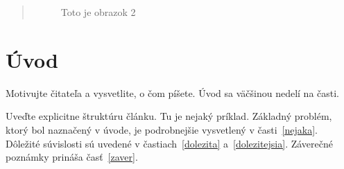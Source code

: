 \documentclass[12pt,twocolumn,twoside,a4paper]{article}
\begin{document}
\begin{abstract}
\begin{figure}[htbp]
\begin{minipage}[b]{0.5\textwidth}
    \caption{Toto je obrazok 2}
    \label{fig:data2}
  \end{minipage}
\end{figure}
\end{abstract}
\section{Úvod}

Motivujte čitateľa a vysvetlite, o čom píšete. Úvod sa väčšinou nedelí na časti.

Uveďte explicitne štruktúru článku. Tu je nejaký príklad.
Základný problém, ktorý bol naznačený v úvode, je podrobnejšie vysvetlený v časti~\ref{nejaka}.
Dôležité súvislosti sú uvedené v častiach~\ref{dolezita} a~\ref{dolezitejsia}.
Záverečné poznámky prináša časť~\ref{zaver}.





\end{document}
